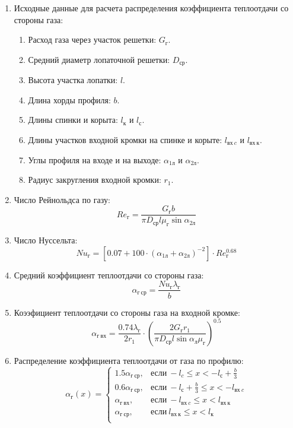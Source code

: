 \documentclass[a4paper,10pt]{article}
\begin{document}
        \begin{enumerate}

            \item Исходные данные для расчета распределения коэффициента теплоотдачи со стороны газа:
            \begin{enumerate}
                \item Расход газа через участок решетки: $G_г$.
                \item Средний диаметр лопаточной решетки: $D_{ср}$.
                \item Высота участка лопатки: $l$.
                \item Длина хорды профиля: $b$.
                \item Длины спинки и корыта: $l_к$ и $l_с$.
                \item Длины участков входной кромки на спинке и корыте: $l_{вх\ c}$ и $l_{вх\ к}$.
                \item Углы профиля на входе и на выходе: $\alpha_{1л}$ и $\alpha_{2л}$.
                \item Радиус закругления входной кромки: $r_1$.
            \end{enumerate}

            \item Число Рейнольдса по газу:
            \[
                Re_г = \frac{G_г b }{\pi D_{ср} l \mu_г \sin{\alpha_{2л}}}
            \]

            \item Число Нуссельта:
            \[
                Nu_г = \left[ 0.07 + 100 \cdot ( \alpha_{1л} + \alpha_{2л} )^{-2} \right] \cdot Re_г ^{0.68}
            \]

            \item Средний коэффициент теплоотдачи со стороны газа:
            \[
                \alpha_{г\ ср} = \frac{Nu_г \lambda_г}{b}
            \]

            \item Коээфициент теплоотдачи со стороны газа на входной кромке:
            \[
                \alpha_{г\ вх} = \frac{0.74 \lambda_г}{2 r_1} \cdot
                    \left(
                        \frac{2 G_г r_1}{\pi D_{ср} l \sin{\alpha_{л}} \mu_г}
                \right) ^ {0.5}
            \]

            \item Распределение коэффициента теплоотдачи от газа по профилю:
            \[
                \alpha_г(x) = \left\{
                    \begin{array}{lc}
                        1.5 \alpha_{г\ ср}, & \text{если}\ -l_c \leq x < -l_с + \frac{b}{3} \\
                        0.6 \alpha_{г\ ср}, & \text{если}\ -l_с + \frac{b}{3} \leq x < -l_{вх\ c} \\
                        \alpha_{г\ вх}, & \text{если}\ -l_{вх\ c} \leq x < l_{вх\ к} \\
                        \alpha_{г\ ср}, & \text{если}\ l_{вх\ к} \leq x < l_к \\
                    \end{array}
                \right.
            \]


\end{enumerate}
\end{document}
